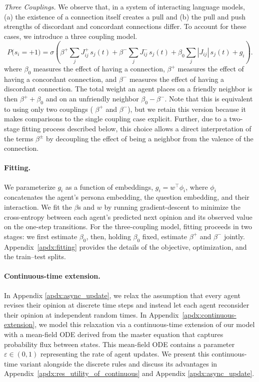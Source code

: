 \textit{Three Couplings.}\label{sec:dissecting-couplings} We observe that, in a system of interacting language models, (a) the existence of a connection itself creates a pull and (b)  the pull and push strengths of discordant and concordant connections differ. To account for these cases, we introduce a three coupling model. 
\[
P\big(s_i = +1\big) = \sigma\!\left(\beta^{+} \sum_{j} J^{+}_{ij}\,s_j(t) + \beta^{-} \sum_{j} J^{-}_{ij}\,s_j(t) + \beta_{0} \sum_{j} |J_{ij}|\,s_j(t) + g_i\right).
\]
where $\beta_{0}$ measures the effect of having a connection, $\beta^{+}$ measures the effect of having a concordant connection, and $\beta^{-}$ measures the effect of having a discordant connection. The total weight an agent places on a friendly neighbor is then $\beta^{+} + \beta_{0}$ and on an unfriendly neighbor $\beta_{0} - \beta^{-}$. Note that this is equivalent to using only two couplings ( $\beta^{+}$ and  $\beta^{-}$), but we retain this version because it makes comparisons to the single coupling case explicit. Further, due to a two-stage fitting process described below, this choice allows a direct interpretation of the terms $\beta^{\pm}$ by decoupling the effect of being a neighbor from the valence of the connection.


\paragraph{Fitting.} We parameterize $g_i$ as a function of embeddings, $ g_i = w^\top \phi_i$, where $\phi_i$ concatenates the agent's persona embedding, the question embedding, and their interaction. We fit the $\beta$s and $w$ by running gradient-descent to minimize the cross-entropy between each agent's predicted next opinion and its observed value on the one-step transitions. For the three-coupling model, fitting proceeds in two stages: we first estimate \(\beta_0\), then, holding \(\beta_0\) fixed, estimate \(\beta^+\) and \(\beta^-\) jointly. Appendix~\ref{apdx:fitting} provides the details of the objective, optimization, and the train--test splits. 

\paragraph{Continuous-time extension.} In Appendix \ref{apdx:async_update}, we relax the assumption that every agent revises their opinion at discrete time steps and instead let each agent reconsider their opinion at independent random times. In  Appendix~\ref{apdx:continuous-extension}, we model this relaxation via a continuous-time extension of our model with a mean-field ODE derived from the master equation that captures probability flux between states. This mean-field ODE contains a parameter $\varepsilon \in (0,1)$ representing the rate of agent updates.  %
We present this continuous-time variant alongside the discrete rules and discuss its advantages in Appendix~\ref{apdx:res_utility_of_continuous} and Appendix \ref{apdx:async_update}.

